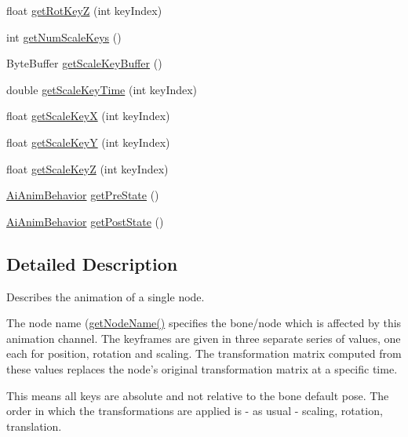 \begin{DoxyCompactItemize}
\item 
float \hyperlink{classjassimp_1_1_ai_node_anim_aa4c4bf7e650303ed2963c2be4a482fda}{get\+Rot\+Key\+Z} (int key\+Index)
\item 
int \hyperlink{classjassimp_1_1_ai_node_anim_a5ce09514a297cb697d8ac0c36dde3536}{get\+Num\+Scale\+Keys} ()
\item 
Byte\+Buffer \hyperlink{classjassimp_1_1_ai_node_anim_a6409ff0a99ea6ee96ab245afa7f53521}{get\+Scale\+Key\+Buffer} ()
\item 
double \hyperlink{classjassimp_1_1_ai_node_anim_ad3be28eebd54e7c5d833999e99778205}{get\+Scale\+Key\+Time} (int key\+Index)
\item 
float \hyperlink{classjassimp_1_1_ai_node_anim_a0db1de493420ca9f524949615748c5df}{get\+Scale\+Key\+X} (int key\+Index)
\item 
float \hyperlink{classjassimp_1_1_ai_node_anim_a6f89841d313f9f7662e865ed3ec4a573}{get\+Scale\+Key\+Y} (int key\+Index)
\item 
float \hyperlink{classjassimp_1_1_ai_node_anim_af8f15538acfc17646852ef1523ea4a89}{get\+Scale\+Key\+Z} (int key\+Index)
\item 
\hyperlink{enumjassimp_1_1_ai_anim_behavior}{Ai\+Anim\+Behavior} \hyperlink{classjassimp_1_1_ai_node_anim_a1d052bdac22a106e5f38b829b9e41db5}{get\+Pre\+State} ()
\item 
\hyperlink{enumjassimp_1_1_ai_anim_behavior}{Ai\+Anim\+Behavior} \hyperlink{classjassimp_1_1_ai_node_anim_ae02eba8fac256414bec95ece55f8d411}{get\+Post\+State} ()
\end{DoxyCompactItemize}


\subsection{Detailed Description}
Describes the animation of a single node.

The node name (\hyperlink{classjassimp_1_1_ai_node_anim_aeaccb17ada9f55009732a47292f3ae27}{get\+Node\+Name()} specifies the bone/node which is affected by this animation channel. The keyframes are given in three separate series of values, one each for position, rotation and scaling. The transformation matrix computed from these values replaces the node's original transformation matrix at a specific time.

This means all keys are absolute and not relative to the bone default pose. The order in which the transformations are applied is -\/ as usual -\/ scaling, rotation, translation.

